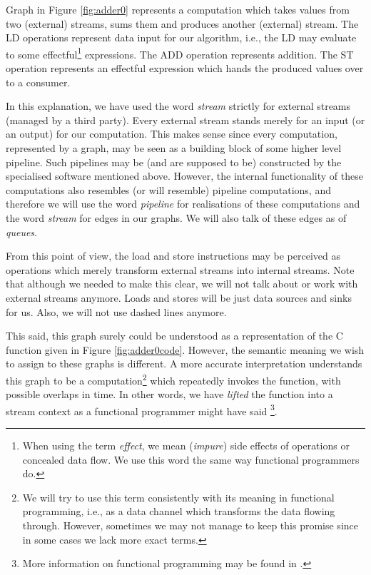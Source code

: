 \FloatBarrier


Graph in Figure \ref{fig:adder0} represents a computation which takes values from two (external) streams, sums them and produces another (external) stream. The LD operations represent data input for our algorithm, i.e., the LD may evaluate to some effectful\footnote{When using the term \emph{effect}, we mean (\emph{impure}) side effects of operations or concealed data flow. We use this word the same way functional programmers do.} expressions. The ADD operation represents addition. The ST operation represents an effectful expression which hands the produced values over to a consumer. 

\FloatBarrier

In this explanation, we have used the word \emph{stream} strictly for external streams (managed by a third party). Every external stream stands merely for an input (or an output) for our computation. This makes sense since every computation, represented by a graph, may be seen as a building block of some higher level pipeline. Such pipelines may be (and are supposed to be) constructed by the specialised software mentioned above. However, the internal functionality of these computations also resembles (or will resemble) pipeline computations, and therefore we will use the word \emph{pipeline} for realisations of these computations and the word \emph{stream} for edges in our graphs. We will also talk of these edges as of \emph{queues}. 


From this point of view, the load and store instructions may be perceived as operations which merely transform external streams into internal streams. Note that although we needed to make this clear, we will not talk about or work with external streams anymore. Loads and stores will be just data sources and sinks for us. Also, we will not use dashed lines anymore.


This said, this graph surely could be understood as a representation of the C function given in Figure \ref{fig:adder0code}. However, the semantic meaning we wish to assign to these graphs is different. A more accurate interpretation understands this graph to be a computation\footnote{We will try to use this term consistently with its meaning in functional programming, i.e., as a data channel which transforms the data flowing through. However, sometimes we may not manage to keep this promise since in some cases we lack more exact terms.} which repeatedly invokes the function, with possible overlaps in time. In other words, we have \emph{lifted} the function into a stream context as a functional programmer might have said \footnote{More information on functional programming may be found in \cite{functional}.}.

